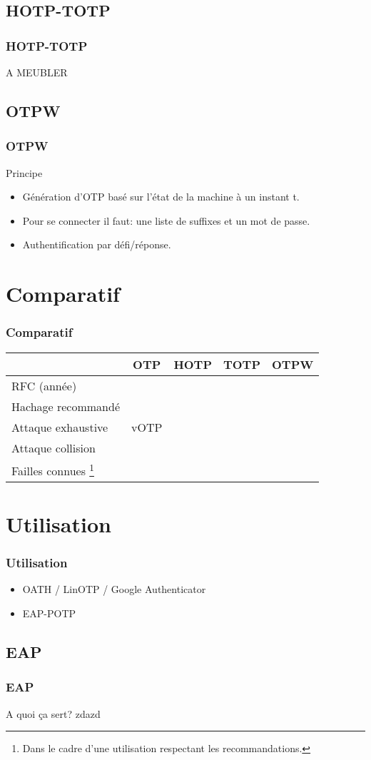 \documentclass{beamer}
\begin{document}
\subsection{HOTP-TOTP}
\begin{frame}
\frametitle{HOTP-TOTP}
 A MEUBLER
\end{frame}

\subsection{OTPW}
\begin{frame}
\frametitle{OTPW}
  \begin{block}{Principe}
   \begin{itemize}
    \item Génération d'OTP basé sur l'état de la machine à un instant t.
    \item Pour se connecter il faut: une liste de suffixes et un mot de passe.
    \item Authentification par défi/réponse.
   \end{itemize}
  \end{block}
\end{frame}


\section{Comparatif}
\begin{frame}
  \frametitle{Comparatif}
  \begin{tabular}{|l|c|c|c|c|}
 \hline
 & OTP & HOTP & TOTP & OTPW\\
 \hline
 RFC (année) & & & &\\
 \hline
 Hachage recommandé & & & &\\
 \hline
 Attaque exhaustive & vOTP & & & \\
 \hline
 Attaque collision & & & &\\
 \hline
 Failles connues \footnote{Dans le cadre d'une utilisation respectant les recommandations.} & & & &\\
 \hline
  \end{tabular}
\end{frame}

\section{Utilisation}
\begin{frame}
\frametitle{Utilisation}
\begin{itemize}
 \item OATH / LinOTP / Google Authenticator
 \item EAP-POTP
\end{itemize}
\end{frame}


\subsection{EAP}
  \begin{frame}
  \frametitle{EAP}
    \begin{block}{A quoi ça sert?}
    zdazd
    \end{block}
    
  \end{frame}
\end{document}
